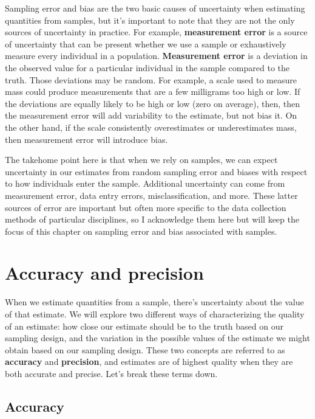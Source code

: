 \documentclass[
]{book}
\begin{document}
Sampling error and bias are the two basic causes of uncertainty when estimating quantities from samples, but it's important to note that they are not the only sources of uncertainty in practice. For example, \textbf{measurement error} is a source of uncertainty that can be present whether we use a sample or exhaustively measure every individual in a population. \textbf{Measurement error} is a deviation in the observed value for a particular individual in the sample compared to the truth. Those deviations may be random. For example, a scale used to measure mass could produce measurements that are a few milligrams too high or low. If the deviations are equally likely to be high or low (zero on average), then, then the measurement error will add variability to the estimate, but not bias it. On the other hand, if the scale consistently overestimates or underestimates mass, then measurement error will introduce bias.

The takehome point here is that when we rely on samples, we can expect uncertainty in our estimates from random sampling error and biases with respect to how individuals enter the sample. Additional uncertainty can come from measurement error, data entry errors, misclassification, and more. These latter sources of error are important but often more specific to the data collection methods of particular disciplines, so I acknowledge them here but will keep the focus of this chapter on sampling error and bias associated with samples.

\section{Accuracy and precision}\label{accuracy-and-precision}

When we estimate quantities from a sample, there's uncertainty about the value of that estimate. We will explore two different ways of characterizing the quality of an estimate: how close our estimate should be to the truth based on our sampling design, and the variation in the possible values of the estimate we might obtain based on our sampling design. These two concepts are referred to as \textbf{accuracy} and \textbf{precision}, and estimates are of highest quality when they are both accurate and precise. Let's break these terms down.

\subsection{Accuracy}\label{accuracy}
\end{document}

